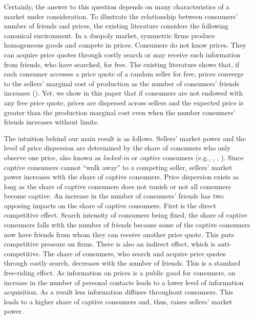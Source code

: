 \documentclass[12pt]{article}
\begin{document}
Certainly, the answer to this question depends on many 
characteristics of a market under consideration.  To illustrate 
the relationship between consumers' number of friends and 
prices, the existing literature considers the following 
canonical environment. In a duopoly market, symmetric firms 
produce homogeneous goods and compete in prices.  Consumers do 
not know prices. They can acquire price quotes through costly 
search or may receive such information from friends, who have 
searched, for free. The existing literature shows that, if each 
consumer accesses a price quote of a random seller for free, 
prices converge to the sellers' marginal cost of production as 
the number of consumers' friends increases 
(\cite{galeotti2010}).  Yet, we show in this paper that if 
consumers are not endowed with any free price quote, prices are 
dispersed across sellers and the expected price is greater than 
the production marginal cost even when the number consumers' 
friends increases without limits.  

The intuition behind our main result is as follows.  Sellers' 
market power and the level of price dispersion are determined by 
the share of consumers who only observe one price, also known as 
\textit{locked-in} or \textit{captive} consumers 
(e.g., \cite{shilony1977}, \cite{varian1980}, 
\cite{armstrongvickers2019}).  Since captive consumers cannot 
``walk away'' to a competing seller, sellers' market power 
increases with the share of captive consumers. Price dispersion 
exists as long as the share of captive consumers does not vanish 
or not all consumers become captive.  An increase in the number 
of consumers' friends has two opposing impacts on the share of 
captive consumers.  First is the direct competitive effect.  
Search intensity of consumers being fixed, the share of captive 
consumers falls with the number of friends because some of the 
captive consumers now have friends from whom they can receive 
another price quote.  This puts competitive pressure on firms.  
There is also an indirect effect, which is anti-competitive.  
The share of consumers, who search and acquire price quotes 
through costly search, decreases with the number of 
friends.  This is a standard free-riding effect. As information 
on prices is a public good for consumers, an increase in the 
number of personal contacts leads to a lower level of 
information acquisition.  As a result less information diffuses 
throughout consumers.  This leads to a higher share of captive 
consumers and, thus, raises sellers' market power.  
\end{document}
